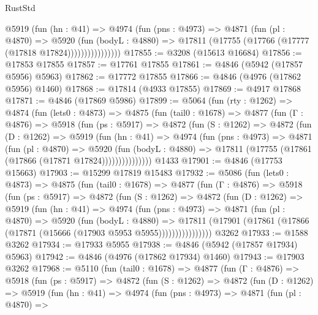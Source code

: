 \begin{lexlean}{RustStd}
\begin{coremodule}
                  @5919
                    (fun (hn : @41) =>
                    @4974
                      (fun (pns : @4973) =>
                      @4871
                        (fun (pl : @4870) =>
                        @5920
                          (fun (bodyL : @4880) =>
                          @17811 (@17755 (@17766 (@17777 (@17818 @17824))))))))))))))))
@17855 := @3208 (@15613 @16684)
@17856 := @17853 @17855
@17857 := @17761 @17855
@17861 := @4846 (@5942 (@17857 @5956) @5963)
@17862 := @17772 @17855
@17866 := @4846 (@4976 (@17862 @5956) @1460)
@17868 := @17814 (@4933 @17855)
@17869 := @4917 @17868
@17871 := @4846 (@17869 @5986)
@17899 := @5064
    (fun (rty : @1262) =>
    @4874
      (fun (lets0 : @4873) =>
      @4875
        (fun (tail0 : @1678) =>
        @4877
          (fun (Γ : @4876) =>
          @5918
            (fun (ps : @5917) =>
            @4872
              (fun (S : @1262) =>
              @4872
                (fun (D : @1262) =>
                @5919
                  (fun (hn : @41) =>
                  @4974
                    (fun (pns : @4973) =>
                    @4871
                      (fun (pl : @4870) =>
                      @5920
                        (fun (bodyL : @4880) =>
                        @17811 (@17755 (@17861 (@17866 (@17871 @17824)))))))))))))))
    @1433
@17901 := @4846 (@17753 @15663)
@17903 := @15299 @17819 @15483
@17932 := @5086
    (fun (lets0 : @4873) =>
    @4875
      (fun (tail0 : @1678) =>
      @4877
        (fun (Γ : @4876) =>
        @5918
          (fun (ps : @5917) =>
          @4872
            (fun (S : @1262) =>
            @4872
              (fun (D : @1262) =>
              @5919
                (fun (hn : @41) =>
                @4974
                  (fun (pns : @4973) =>
                  @4871
                    (fun (pl : @4870) =>
                    @5920
                      (fun (bodyL : @4880) =>
                      @17811
                        (@17901 (@17861 (@17866 (@17871 (@15666 (@17903 @5953 @5955))))))))))))))))
    @3262
@17933 := @1588 @3262
@17934 := @17933 @5955
@17938 := @4846 (@5942 (@17857 @17934) @5963)
@17942 := @4846 (@4976 (@17862 @17934) @1460)
@17943 := @17903 @3262
@17968 := @5110
    (fun (tail0 : @1678) =>
    @4877
      (fun (Γ : @4876) =>
      @5918
        (fun (ps : @5917) =>
        @4872
          (fun (S : @1262) =>
          @4872
            (fun (D : @1262) =>
            @5919
              (fun (hn : @41) =>
              @4974
                (fun (pns : @4973) =>
                @4871
                  (fun (pl : @4870) =>

\end{coremodule}
\end{lexlean}
